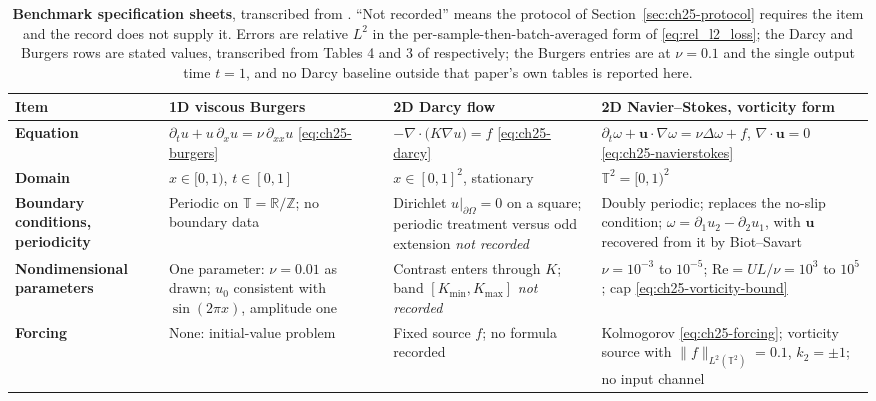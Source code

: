 \begin{table}[p]
\centering
\captionsetup{font=footnotesize}
\scriptsize
\caption{\textbf{Benchmark specification sheets}, transcribed from
. ``Not recorded'' means the
protocol of Section~\ref{sec:ch25-protocol} requires the item and the record does not
supply it. Errors are relative $L^{2}$ in the per-sample-then-batch-averaged form of
\eqref{eq:rel_l2_loss}; the Darcy and Burgers rows are stated
values, transcribed from Tables 4 and 3 of \cite{li2021fourier} respectively; the
Burgers entries are at $\nu = 0.1$ and the single output time $t = 1$, and no Darcy
baseline outside that paper's own tables is reported here.}
\label{tab:appc_specs}
\begin{tabularx}{\textwidth}{@{}>{\raggedright\arraybackslash}p{2.45cm}%
  >{\raggedright\arraybackslash}X >{\raggedright\arraybackslash}X
  >{\raggedright\arraybackslash}X@{}}
\toprule
\textbf{Item} & \textbf{1D viscous Burgers} & \textbf{2D Darcy flow} & \textbf{2D Navier--Stokes, vorticity form} \\
\midrule
\textbf{Equation}
& $\partial_t u + u\,\partial_x u = \nu\,\partial_{xx}u$ \eqref{eq:ch25-burgers}
& $-\nabla\cdot\!\big(K\nabla u\big) = f$ \eqref{eq:ch25-darcy}
& $\partial_t\omega + \mathbf{u}\cdot\nabla\omega = \nu\Delta\omega + f$, $\nabla\cdot\mathbf{u}=0$ \eqref{eq:ch25-navierstokes} \\
\textbf{Domain}
& $x \in [0,1)$, $t \in [0,1]$
& $x \in [0,1]^{2}$, stationary
& $\mathbb{T}^{2} = [0,1)^{2}$ \\
\textbf{Boundary conditions, periodicity}
& Periodic on $\mathbb{T} = \mathbb{R}/\mathbb{Z}$; no boundary data
& Dirichlet $u|_{\partial\Omega} = 0$ on a square; periodic treatment versus odd extension \emph{not recorded}
& Doubly periodic; replaces the no-slip condition; $\omega = \partial_1 u_2 - \partial_2 u_1$, with $\mathbf{u}$ recovered from it by Biot--Savart \\
\textbf{Nondimensional parameters}
& One parameter: $\nu = 0.01$ as drawn; $u_0$ consistent with $\sin(2\pi x)$, amplitude one
& Contrast enters through $K$; band $[K_{\min}, K_{\max}]$ \emph{not recorded}
& $\nu = 10^{-3}$ to $10^{-5}$; $\mathrm{Re} = UL/\nu = 10^{3}$ to $10^{5}$; cap \eqref{eq:ch25-vorticity-bound} \\
\textbf{Forcing}
& None: initial-value problem
& Fixed source $f$; no formula recorded
& Kolmogorov \eqref{eq:ch25-forcing}; vorticity source with $\|f\|_{L^{2}(\mathbb{T}^{2})} = 0.1$, $k_2 = \pm 1$; no input channel \\

\end{tabularx}
\end{table}
